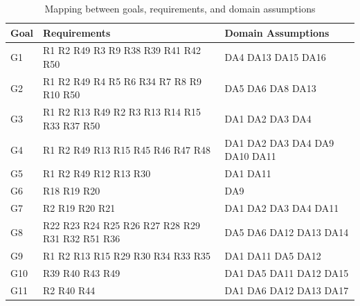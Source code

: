 \begin{table}[H]
  \begin{tabular}{|l|l|p{5cm}| }
    \hline
    \textbf{Goal} & \textbf{Requirements} & \textbf{Domain Assumptions}      \\
    \hline
    G1 & R1 R2 R49 R3 R9 R38 R39 R41 R42 R50 & DA4 DA13 DA15 DA16 \\
    \hline
    G2 & R1 R2 R49 R4 R5 R6 R34 R7 R8 R9 R10 R50 & DA5 DA6 DA8 DA13 \\
    \hline
    G3 & R1 R2 R13 R49 R2 R3 R13 R14 R15 R33 R37 R50 & DA1 DA2 DA3 DA4 \\
    \hline
    G4 & R1 R2 R49 R13 R15 R45 R46 R47 R48 & DA1 DA2 DA3 DA4 DA9 DA10 DA11  \\
    \hline
    G5 & R1 R2 R49 R12 R13 R30 & DA1 DA11  \\
    \hline
    G6 & R18 R19 R20 & DA9 \\
    \hline
    G7 & R2 R19 R20 R21 & DA1 DA2 DA3 DA4 DA11 \\
    \hline
    G8 & R22 R23 R24 R25 R26 R27 R28 R29 R31 R32 R51 R36 & DA5 DA6 DA12 DA13 DA14 \\
    \hline
    G9 & R1 R2 R13 R15 R29 R30 R34 R33 R35 & DA1 DA11 DA5 DA12
    \\
    \hline
    G10 & R39 R40 R43 R49 & DA1 DA5 DA11 DA12 DA15   \\
    \hline
    G11 & R2 R40 R44 & DA1 DA6 DA12 DA13 DA17 \\
    \hline
  \end{tabular}
  \caption{Mapping between goals, requirements, and domain assumptions}
  \label{tab:mapping}
\end{table}

